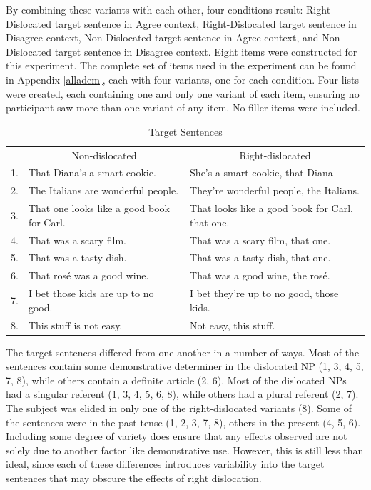 \documentclass[titlepage,12pt]{article}
\begin{document}
By combining these variants with each other, four conditions result: Right-Dislocated target sentence in Agree context, Right-Dislocated target sentence in Disagree context, Non-Dislocated target sentence in Agree context, and Non-Dislocated target sentence in Disagree context. Eight items were constructed for this experiment. The complete set of items used in the experiment can be found in Appendix \ref{alladem}, each with four variants, one for each condition. Four lists were created, each containing one and only one variant of each item, ensuring no participant saw more than one variant of any item. No filler items were included.

\begin{table}[htb]
\centering
\small
\caption{Target Sentences}
\label{target_sents}
\begin{tabular}{lll}
 & \multicolumn{1}{c}{Non-dislocated} & \multicolumn{1}{c}{Right-dislocated} \\ \cline{2-3}
1. & That Diana's a smart cookie. & She's a smart cookie, that Diana \\
2. & The Italians are wonderful people. & They're wonderful people, the Italians. \\
3. & That one looks like a good book for Carl. & That looks like a good book for Carl, that one. \\
4. & That was a scary film. & That was a scary film, that one. \\
5. & That was a tasty dish. & That was a tasty dish, that one. \\
6. & That rosé was a good wine. & That was a good wine, the rosé. \\
7. & I bet those kids are up to no good. & I bet they're up to no good, those kids. \\
8. & This stuff is not easy. & Not easy, this stuff.
\end{tabular}
\end{table}

The target sentences differed from one another in a number of ways. Most of the sentences contain some demonstrative determiner in the dislocated NP (1, 3, 4, 5, 7, 8), while others contain a definite article (2, 6). Most of the dislocated NPs had a singular referent (1, 3, 4, 5, 6, 8), while others had a plural referent (2, 7). The subject was elided in only one of the right-dislocated variants (8). Some of the sentences were in the past tense (1, 2, 3, 7, 8), others in the present (4, 5, 6).  Including some degree of variety does ensure that any effects observed are not solely due to another factor like demonstrative use. However, this is still less than ideal, since each of these differences introduces variability into the target sentences that may obscure the effects of right dislocation.
\end{document}

